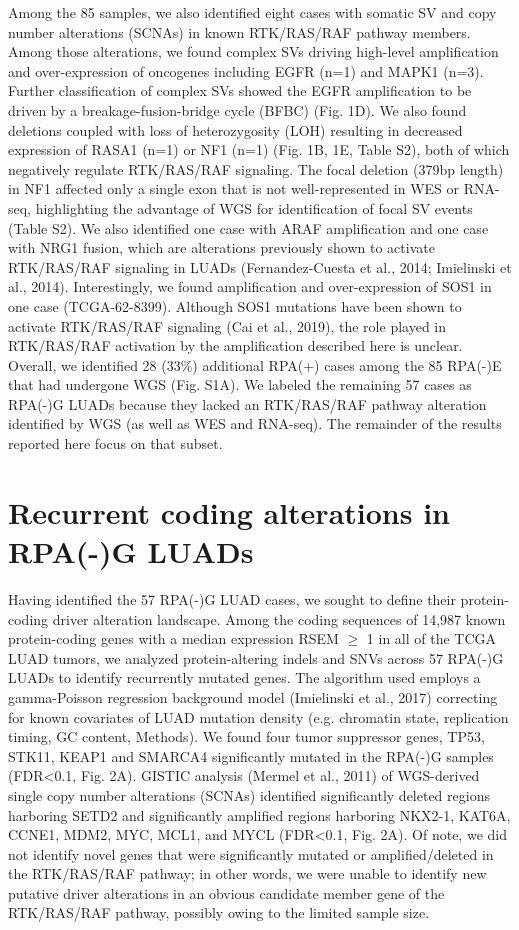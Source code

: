 \documentclass[phd,tocprelim]{cornell}
\begin{document}
Among the 85 samples, we also identified eight cases with somatic SV and copy number alterations (SCNAs) in known RTK/RAS/RAF pathway members. Among those alterations, we found complex SVs driving high-level amplification and over-expression of oncogenes including EGFR (n=1) and MAPK1 (n=3). Further classification of complex SVs showed the EGFR amplification to be driven by a breakage-fusion-bridge cycle (BFBC) (Fig. 1D). We also found deletions coupled with loss of heterozygosity (LOH) resulting in decreased expression of RASA1 (n=1) or NF1 (n=1) (Fig. 1B, 1E, Table S2), both of which negatively regulate RTK/RAS/RAF signaling. The focal deletion (379bp length) in NF1 affected only a single exon that is not well-represented in WES or RNA-seq, highlighting the advantage of WGS for identification of focal SV events (Table S2). We also identified one case with ARAF amplification and one case with NRG1 fusion, which are alterations previously shown to activate RTK/RAS/RAF signaling in LUADs (Fernandez-Cuesta et al., 2014; Imielinski et al., 2014). Interestingly, we found amplification and over-expression of SOS1 in one case (TCGA-62-8399). Although SOS1 mutations have been shown to activate RTK/RAS/RAF signaling (Cai et al., 2019), the role played in RTK/RAS/RAF activation by the amplification described here is unclear.
Overall, we identified 28 (33\%) additional RPA(+) cases among the 85 RPA(-)E that had undergone WGS (Fig. S1A). We labeled the remaining 57 cases as RPA(-)G LUADs because they lacked an RTK/RAS/RAF pathway alteration identified by WGS (as well as WES and RNA-seq). The remainder of the results reported here focus on that subset.

\section{Recurrent coding alterations in RPA(-)G LUADs }
Having identified the 57 RPA(-)G LUAD cases, we sought to define their protein-coding driver alteration landscape. Among the coding sequences of 14,987 known protein-coding genes with a median expression RSEM $\ge$ 1 in all of the TCGA LUAD tumors, we analyzed protein-altering indels and SNVs across 57 RPA(-)G LUADs to identify recurrently mutated genes. The algorithm used employs a gamma-Poisson regression background model (Imielinski et al., 2017) correcting for known covariates of LUAD mutation density (e.g. chromatin state, replication timing, GC content, Methods). We found four tumor suppressor genes, TP53, STK11, KEAP1 and SMARCA4 significantly mutated in the RPA(-)G samples (FDR<0.1, Fig. 2A). GISTIC analysis (Mermel et al., 2011) of WGS-derived single copy number alterations (SCNAs) identified significantly deleted regions harboring SETD2 and significantly amplified regions harboring NKX2-1, KAT6A, CCNE1, MDM2, MYC, MCL1, and MYCL (FDR<0.1, Fig. 2A). Of note, we did not identify novel genes that were significantly mutated or amplified/deleted in the RTK/RAS/RAF pathway; in other words, we were unable to identify new putative driver alterations in an obvious candidate member gene of the RTK/RAS/RAF pathway, possibly owing to the limited sample size.  
\end{document}
